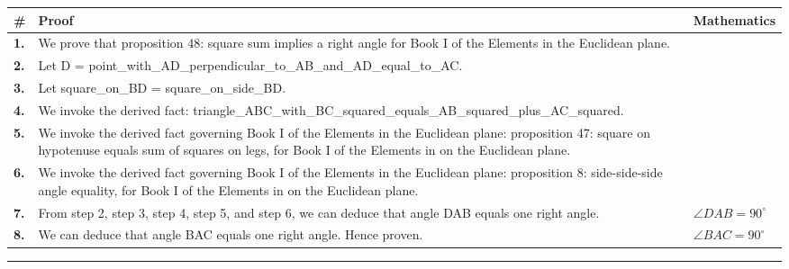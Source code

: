 \documentclass[11pt]{article}
\theoremstyle{definition}
\begin{document}
\begin{tabular}{@{} >{\raggedright\arraybackslash}p{} >{\raggedright\arraybackslash}p{} >{\raggedleft\arraybackslash}p{} @{}}
\textbf{\#} & \textbf{Proof} & \textbf{Mathematics} \\
\midrule
\textbf{1.} & We prove that proposition 48: square sum implies a right angle for Book I of the Elements in the Euclidean plane. & \\[0.45em]
\textbf{2.} & Let D = point\_with\_AD\_perpendicular\_to\_AB\_and\_AD\_equal\_to\_AC. & \\[0.45em]
\textbf{3.} & Let square\_on\_BD = square\_on\_side\_BD. & \\[0.45em]
\textbf{4.} & We invoke the derived fact: triangle\_ABC\_with\_BC\_squared\_equals\_AB\_squared\_plus\_AC\_squared. & \\[0.45em]
\textbf{5.} & We invoke the derived fact governing Book I of the Elements in the Euclidean plane: proposition 47: square on hypotenuse equals sum of squares on legs, for Book I of the Elements in on the Euclidean plane. & \\[0.45em]
\textbf{6.} & We invoke the derived fact governing Book I of the Elements in the Euclidean plane: proposition 8: side-side-side angle equality, for Book I of the Elements in on the Euclidean plane. & \\[0.45em]
\textbf{7.} & From step 2, step 3, step 4, step 5, and step 6, we can deduce that angle DAB equals one right angle. & $\displaystyle \angle DAB = 90^\circ$ \\[0.45em]
\textbf{8.} & We can deduce that angle BAC equals one right angle. Hence proven. & $\displaystyle \angle BAC = 90^\circ$ \\[0.45em]
\bottomrule
\end{tabular}
\label{thm:Geometry-Euclid Book I-proposition_48_square_sum_implies_a_right_angle}
\par\medskip\hrule
\end{document}
